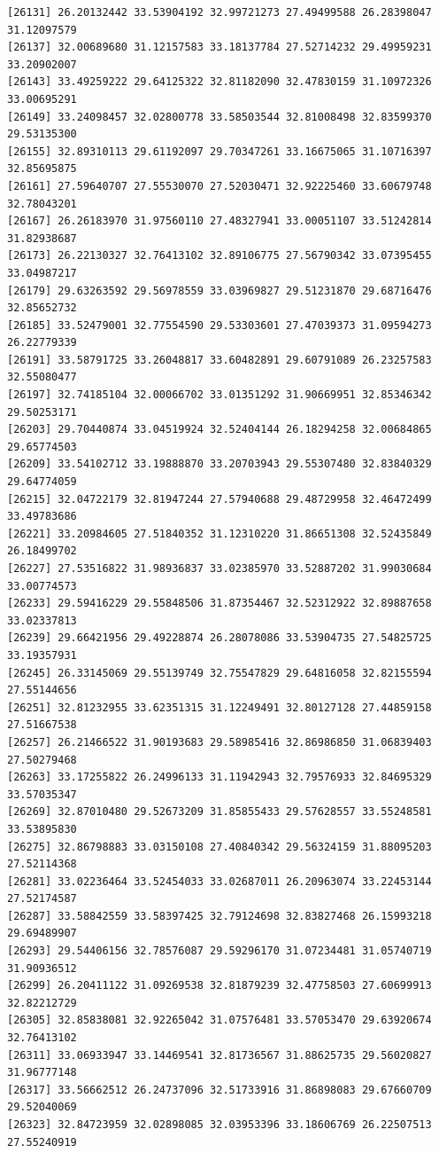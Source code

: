 \documentclass[
  letterpaper,
  DIV=11,
  numbers=noendperiod]{scrartcl}
\begin{document}
\begin{verbatim}
[26131] 26.20132442 33.53904192 32.99721273 27.49499588 26.28398047 31.12097579
[26137] 32.00689680 31.12157583 33.18137784 27.52714232 29.49959231 33.20902007
[26143] 33.49259222 29.64125322 32.81182090 32.47830159 31.10972326 33.00695291
[26149] 33.24098457 32.02800778 33.58503544 32.81008498 32.83599370 29.53135300
[26155] 32.89310113 29.61192097 29.70347261 33.16675065 31.10716397 32.85695875
[26161] 27.59640707 27.55530070 27.52030471 32.92225460 33.60679748 32.78043201
[26167] 26.26183970 31.97560110 27.48327941 33.00051107 33.51242814 31.82938687
[26173] 26.22130327 32.76413102 32.89106775 27.56790342 33.07395455 33.04987217
[26179] 29.63263592 29.56978559 33.03969827 29.51231870 29.68716476 32.85652732
[26185] 33.52479001 32.77554590 29.53303601 27.47039373 31.09594273 26.22779339
[26191] 33.58791725 33.26048817 33.60482891 29.60791089 26.23257583 32.55080477
[26197] 32.74185104 32.00066702 33.01351292 31.90669951 32.85346342 29.50253171
[26203] 29.70440874 33.04519924 32.52404144 26.18294258 32.00684865 29.65774503
[26209] 33.54102712 33.19888870 33.20703943 29.55307480 32.83840329 29.64774059
[26215] 32.04722179 32.81947244 27.57940688 29.48729958 32.46472499 33.49783686
[26221] 33.20984605 27.51840352 31.12310220 31.86651308 32.52435849 26.18499702
[26227] 27.53516822 31.98936837 33.02385970 33.52887202 31.99030684 33.00774573
[26233] 29.59416229 29.55848506 31.87354467 32.52312922 32.89887658 33.02337813
[26239] 29.66421956 29.49228874 26.28078086 33.53904735 27.54825725 33.19357931
[26245] 26.33145069 29.55139749 32.75547829 29.64816058 32.82155594 27.55144656
[26251] 32.81232955 33.62351315 31.12249491 32.80127128 27.44859158 27.51667538
[26257] 26.21466522 31.90193683 29.58985416 32.86986850 31.06839403 27.50279468
[26263] 33.17255822 26.24996133 31.11942943 32.79576933 32.84695329 33.57035347
[26269] 32.87010480 29.52673209 31.85855433 29.57628557 33.55248581 33.53895830
[26275] 32.86798883 33.03150108 27.40840342 29.56324159 31.88095203 27.52114368
[26281] 33.02236464 33.52454033 33.02687011 26.20963074 33.22453144 27.52174587
[26287] 33.58842559 33.58397425 32.79124698 32.83827468 26.15993218 29.69489907
[26293] 29.54406156 32.78576087 29.59296170 31.07234481 31.05740719 31.90936512
[26299] 26.20411122 31.09269538 32.81879239 32.47758503 27.60699913 32.82212729
[26305] 32.85838081 32.92265042 31.07576481 33.57053470 29.63920674 32.76413102
[26311] 33.06933947 33.14469541 32.81736567 31.88625735 29.56020827 31.96777148
[26317] 33.56662512 26.24737096 32.51733916 31.86898083 29.67660709 29.52040069
[26323] 32.84723959 32.02898085 32.03953396 33.18606769 26.22507513 27.55240919

\end{verbatim}
\end{document}
